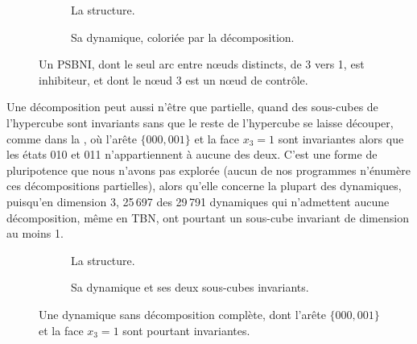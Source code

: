 \begin{figure}[H]
    \centering
    \begin{subfigure}{0.48\linewidth}
        \centering
        \caption{La structure.}
    \end{subfigure}
    \hfill
    \begin{subfigure}{0.48\linewidth}
        \centering
        \caption{Sa dynamique, coloriée par la décomposition.}
    \end{subfigure}
    \caption{Un PSBNI, dont le seul arc entre nœuds distincts, de 3 vers 1, est inhibiteur, et dont le nœud 3 est un nœud de contrôle.}
    \label{fig:psbni-3d}
\end{figure}

Une décomposition peut aussi n'être que partielle, quand des sous-cubes de l'hypercube sont invariants sans que le reste de l'hypercube se laisse découper, comme dans la , où l'arête $\{000, 001\}$ et la face $x_3 = 1$ sont invariantes alors que les états 010 et 011 n'appartiennent à aucune des deux.
C'est une forme de pluripotence que nous n'avons pas explorée (aucun de nos programmes n'énumère ces décompositions partielles), alors qu'elle concerne la plupart des dynamiques, puisqu'en dimension 3, 25\,697 des 29\,791 dynamiques qui n'admettent aucune décomposition, même en TBN, ont pourtant un sous-cube invariant de dimension au moins 1.

\begin{figure}[H]
    \centering
    \begin{subfigure}{0.48\linewidth}
        \centering
        \caption{La structure.}
    \end{subfigure}
    \hfill
    \begin{subfigure}{0.48\linewidth}
        \centering
        \caption{Sa dynamique et ses deux sous-cubes invariants.}
    \end{subfigure}
    \caption{Une dynamique sans décomposition complète, dont l'arête $\{000, 001\}$ et la face $x_3 = 1$ sont pourtant invariantes.}
    \label{fig:partielle-3d}
\end{figure}

